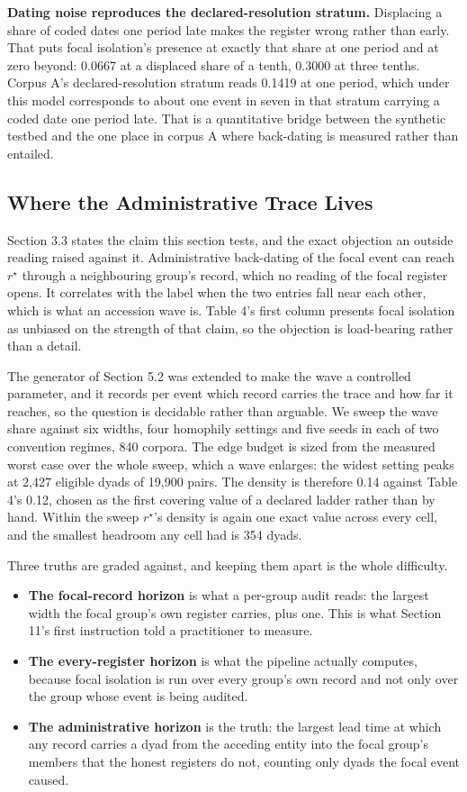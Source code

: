 \documentclass[twoside,11pt]{article}
\providecommand{\tightlist}{%
  \setlength{\itemsep}{0pt}\setlength{\parskip}{0pt}}
\begin{document}
\textbf{Dating noise reproduces the declared-resolution stratum.} Displacing a share of coded dates one period late makes the register wrong rather than early. That puts focal isolation's presence at exactly that share at one period and at zero beyond: 0.0667 at a displaced share of a tenth, 0.3000 at three tenths. Corpus A's declared-resolution stratum reads 0.1419 at one period, which under this model corresponds to about one event in seven in that stratum carrying a coded date one period late. That is a quantitative bridge between the synthetic testbed and the one place in corpus A where back-dating is measured rather than entailed.

\subsection{Where the Administrative Trace Lives}

Section 3.3 states the claim this section tests, and the exact objection an outside reading raised against it. Administrative back-dating of the focal event can reach \(r^{\star}\) through a neighbouring group's record, which no reading of the focal register opens. It correlates with the label when the two entries fall near each other, which is what an accession wave is. Table 4's first column presents focal isolation as unbiased on the strength of that claim, so the objection is load-bearing rather than a detail.

The generator of Section 5.2 was extended to make the wave a controlled parameter, and it records per event which record carries the trace and how far it reaches, so the question is decidable rather than arguable. We sweep the wave share against six widths, four homophily settings and five seeds in each of two convention regimes, 840 corpora. The edge budget is sized from the measured worst case over the whole sweep, which a wave enlarges: the widest setting peaks at 2,427 eligible dyads of 19,900 pairs. The density is therefore 0.14 against Table 4's 0.12, chosen as the first covering value of a declared ladder rather than by hand. Within the sweep \(r^{\star}\)'s density is again one exact value across every cell, and the smallest headroom any cell had is 354 dyads.

Three truths are graded against, and keeping them apart is the whole difficulty.

\begin{itemize}
\tightlist
\item
  \textbf{The focal-record horizon} is what a per-group audit reads: the largest width the focal group's own register carries, plus one. This is what Section 11's first instruction told a practitioner to measure.
\item
  \textbf{The every-register horizon} is what the pipeline actually computes, because focal isolation is run over every group's own record and not only over the group whose event is being audited.
\item
  \textbf{The administrative horizon} is the truth: the largest lead time at which any record carries a dyad from the acceding entity into the focal group's members that the honest registers do not, counting only dyads the focal event caused.
\end{itemize}
\end{document}
